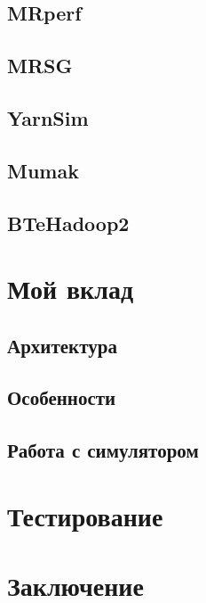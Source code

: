 \documentclass[a4paper,12pt]{article}
\begin{document}
    \subsection{MRperf}

    \subsection{MRSG}

    \subsection{YarnSim}

    \subsection{Mumak}

    \subsection{BTeHadoop2}

    \newpage

    \section{Мой вклад}

    \subsection{Архитектура}

    \subsection{Особенности}

    \subsection{Работа с симулятором}

    \newpage

    \section{Тестирование}

    \newpage

    \section{Заключение}

    \newpage

    \printbibliography
\end{document}
